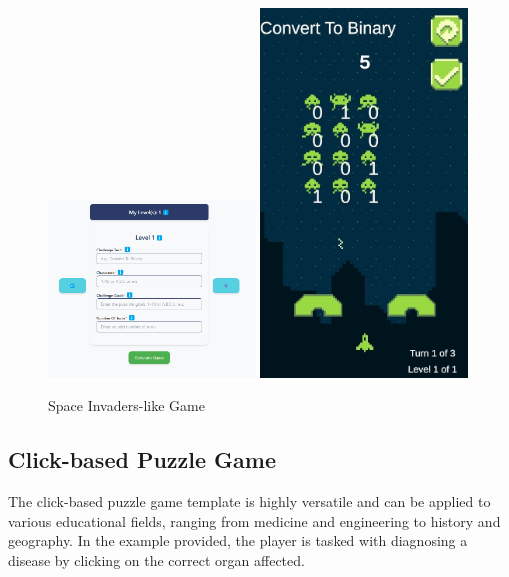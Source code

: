 \begin{figure}
    \centering
    \includegraphics[width=0.49\textwidth]{figures/Space_Invaders/Instructor_Portal_Space_Invader.png}
    \includegraphics[width=0.49\textwidth]{figures/Space_Invaders/Space_Invaders_Game.jpeg}
    \caption{Space Invaders-like Game}
    \label{fig:space-invaders-game}
\end{figure}




\subsection{Click-based Puzzle Game}

The click-based puzzle game template is highly versatile and can be applied to various educational fields, ranging from medicine and engineering to history and geography. In the example provided, the player is tasked with diagnosing a disease by clicking on the correct organ affected.

